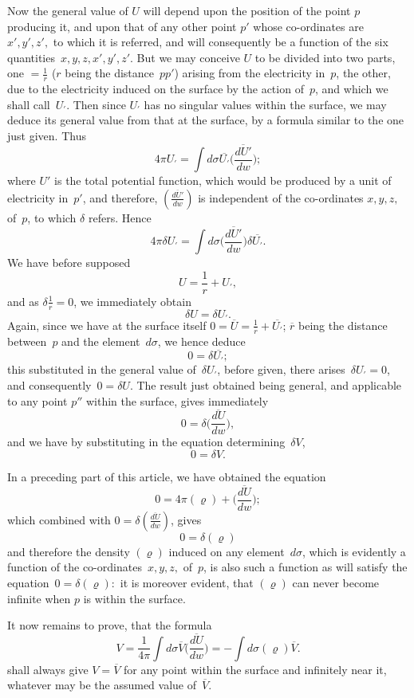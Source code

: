 \documentclass[12pt,notitlepage]{amsart}
\renewcommand{\rho}{\varrho}
\begin{document}
Now the general value of $U$ will depend upon the position of the
point $p$ producing it, and upon that of any other point $p'$ whose co-ordinates
are $x',y',z',$ to which it is referred, and will consequently be a function of
the six quantities~$x,y,z,x',y',z'$.
But we may conceive $U$ to be divided
into two parts, one $=\frac1r$ ($r$ being the distance~$pp'$)
arising from the electricity
in~$p$, the other, due to the electricity induced
on the surface by the action of~$p$,
and which we shall call~$U_\prime$.
Then since $U_\prime$ has no singular values within
the surface, we may deduce its general value from that at the surface, by a
formula similar to the one just given. Thus
\[
4\pi U_\prime=\int d\sigma\overline{U_\prime}
\biggl(\frac{\overline{dU'}}{dw}\biggr);
\]
where $U'$ is the total potential function, which would be produced by a unit
of electricity in~$p'$, and therefore,
$(\frac{\overline{dU'}}{dw})$ is independent of the co-ordinates
$x,y,z,$ of~$p$, to which $\delta$ refers. Hence
\[
4\pi\delta U_\prime=\int d\sigma
\biggl(\frac{\overline{dU'}}{dw}\biggr)\delta\overline{U_\prime}.
\]
We have before supposed
\[
U=\frac1r+U_\prime,
\]
and as $\delta\frac1r=0$, we immediately obtain
\[
\delta U=\delta U_\prime.
\]
Again, since we have at the surface itself
$0=\overline{U}=\frac{1}{\overline{r}}+\overline{U_\prime}$;
$\overline{r}$ being the
distance between~$p$ and the element~$d\sigma$, we hence deduce
\[
0=\delta\overline{U_\prime};
\]
this substituted in the general value of~$\delta U_\prime$,
before given, there arises~$\delta U_\prime=0$,
and consequently~$0=\delta U$.
The result just obtained being general, and applicable
to any point $p''$ within the surface, gives immediately
\[
0=\delta
\biggl(\frac{\overline{dU}}{dw}\biggr),
\]
and we have by substituting in the equation determining~$\delta V$,
\[
0=\delta V.
\]

In a preceding part of this article, we have obtained the equation
\[
0=4\pi(\rho)+\biggl(\frac{\overline{dU}}{dw}\biggr);
\]
which combined with $0=\delta(\frac{\overline{dU}}{dw})$, gives
\[
0=\delta(\rho)
\]
and therefore the density $(\rho)$ induced on
any element~$d\sigma$, which is evidently
a function of the co-ordinates~$x,y,z,$ of~$p$, is also such a function as will
satisfy the equation~$0=\delta(\rho):$
it is moreover evident, that $(\rho)$ can never become
infinite when $p$ is within the surface.

It now remains to prove, that the formula
\[
V=\frac{1}{4\pi}\int d\sigma\overline{V}
\biggl(\frac{\overline{dU}}{dw}\biggr)
=-\int d\sigma(\rho)\overline{V}.
\]
shall always give $V=\overline{V}$
for any point within the surface and infinitely near
it, whatever may be the assumed value of~$\overline{V}$.
\end{document}
